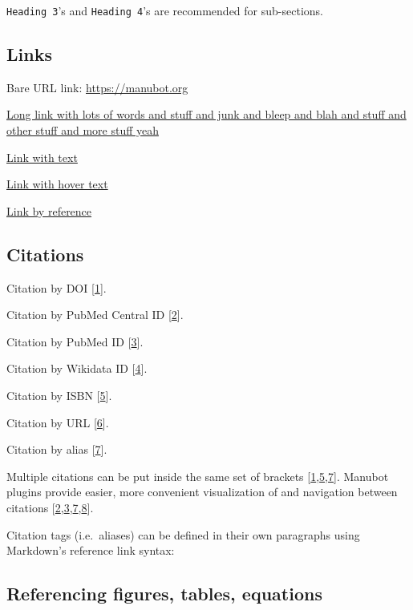 \documentclass[
]{article}
\begin{document}
\texttt{Heading\ 3}'s and \texttt{Heading\ 4}'s are recommended for sub-sections.

\hypertarget{links}{%
\subsection{Links}\label{links}}

Bare URL link: \url{https://manubot.org}

\href{https://manubot.org}{Long link with lots of words and stuff and junk and bleep and blah and stuff and other stuff and more stuff yeah}

\href{https://manubot.org}{Link with text}

\href{https://manubot.org}{Link with hover text}

\href{https://manubot.org}{Link by reference}

\hypertarget{citations}{%
\subsection{Citations}\label{citations}}

Citation by DOI {[}\protect\hyperlink{ref-IhliSZDo}{1}{]}.

Citation by PubMed Central ID {[}\protect\hyperlink{ref-mSMVRkoc}{2}{]}.

Citation by PubMed ID {[}\protect\hyperlink{ref-126Wi5Us4}{3}{]}.

Citation by Wikidata ID {[}\protect\hyperlink{ref-QhC8yJ7V}{4}{]}.

Citation by ISBN {[}\protect\hyperlink{ref-zBPP9YKu}{5}{]}.

Citation by URL {[}\protect\hyperlink{ref-1GGGHdsew}{6}{]}.

Citation by alias {[}\protect\hyperlink{ref-PZMP42Ak}{7}{]}.

Multiple citations can be put inside the same set of brackets {[}\protect\hyperlink{ref-IhliSZDo}{1},\protect\hyperlink{ref-zBPP9YKu}{5},\protect\hyperlink{ref-PZMP42Ak}{7}{]}.
Manubot plugins provide easier, more convenient visualization of and navigation between citations {[}\protect\hyperlink{ref-mSMVRkoc}{2},\protect\hyperlink{ref-126Wi5Us4}{3},\protect\hyperlink{ref-PZMP42Ak}{7},\protect\hyperlink{ref-YuJbg3zO}{8}{]}.

Citation tags (i.e.~aliases) can be defined in their own paragraphs using Markdown's reference link syntax:

\hypertarget{referencing-figures-tables-equations}{%
\subsection{Referencing figures, tables, equations}\label{referencing-figures-tables-equations}}
\end{document}
